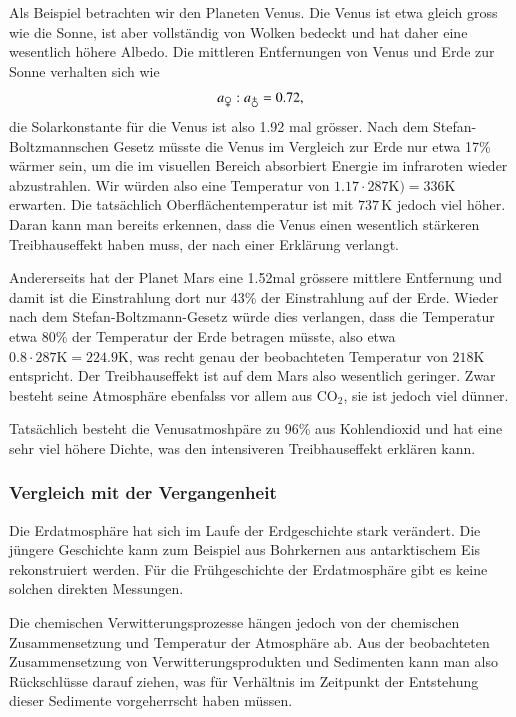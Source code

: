 Als Beispiel betrachten wir den Planeten Venus.
Die Venus ist etwa gleich gross wie die Sonne, ist aber vollständig
von Wolken bedeckt und hat daher eine wesentlich höhere Albedo.
Die mittleren Entfernungen von Venus und Erde zur Sonne verhalten
sich wie
\[
a_{\venus}
:
a_{\earth}
=
0.72,
\]
die Solarkonstante für die Venus ist also 1.92 mal grösser.
Nach dem Stefan-Boltzmannschen Gesetz müsste die Venus im Vergleich
zur Erde nur etwa 17\% wärmer sein, um die im visuellen Bereich
absorbiert Energie im infraroten wieder abzustrahlen.
Wir würden also eine Temperatur von $1.17\cdot 287\text{K})=336\text{K}$
erwarten.
Die tatsächlich Oberflächentemperatur ist mit $737\,\text{K}$ jedoch viel
höher.
Daran kann man bereits erkennen, dass die Venus einen wesentlich
stärkeren Treibhauseffekt haben muss, der nach einer Erklärung
verlangt.

Andererseits hat der Planet Mars eine 1.52mal grössere mittlere
Entfernung und damit ist die Einstrahlung dort nur 43\% der
Einstrahlung auf der Erde.
Wieder nach dem Stefan-Boltzmann-Gesetz würde dies verlangen, dass die
Temperatur etwa 80\% der Temperatur der Erde betragen müsste,
also etwa $0.8\cdot 287\text{K} = 224.9\text{K}$, was recht genau
der beobachteten Temperatur von $218\text{K}$ entspricht.
Der Treibhauseffekt ist auf dem Mars also wesentlich geringer.
Zwar besteht seine Atmosphäre ebenfalss vor allem aus $\text{CO}_2$,
sie ist jedoch viel dünner.

Tatsächlich besteht die Venusatmoshpäre zu 96\% aus Kohlendioxid und
hat eine sehr viel höhere Dichte, was den intensiveren Treibhauseffekt
erklären kann.

\subsubsection{Vergleich mit der Vergangenheit}
Die Erdatmosphäre hat sich im Laufe der Erdgeschichte stark verändert.
Die jüngere Geschichte kann zum Beispiel aus Bohrkernen aus antarktischem
Eis rekonstruiert werden.
Für die Frühgeschichte der Erdatmosphäre gibt es keine solchen direkten
Messungen.

Die chemischen Verwitterungsprozesse hängen jedoch von der chemischen
Zusammensetzung und Temperatur der Atmosphäre ab.
Aus der beobachteten Zusammensetzung von Verwitterungsprodukten und
Sedimenten kann man also Rückschlüsse darauf ziehen, was für Verhältnis
im Zeitpunkt der Entstehung dieser Sedimente vorgeherrscht haben müssen.

